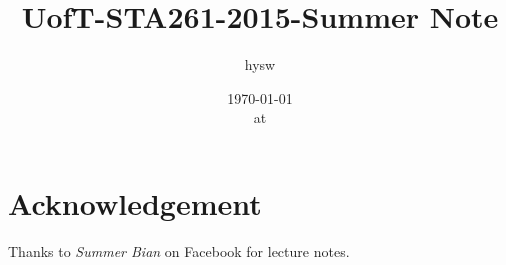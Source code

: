 \documentclass[letterpaper,twocolumn]{article}
\title{UofT-STA261-2015-Summer Note}
\author{hysw}
\date{\today\\ at \currenttime}
\begin{document}
\maketitle

\tableofcontents











% 
% 
% 
% 
% 
% 
% 
% 
% 
% 
\section{Acknowledgement}
Thanks to \textit{Summer Bian} on Facebook for lecture notes.
\end{document}
